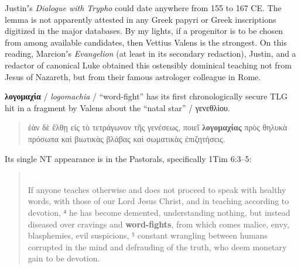 Justinʼs \textit{Dialogue with Trypho} could date anywhere from 155 to 167 CE. %
The lemma is not apparently attested in any Greek papyri or Greek inscriptions %
digitized in the major databases. %
By my lights, if a progenitor is to be chosen from among available candidates, %
then Vettius Valens is the strongest. %
On this reading, Marcionʼs \textit{Evangelion} (at least in its secondary redaction), %
Justin, and a redactor of canonical Luke obtained this ostensibly dominical teaching %
not from Jesus of Nazareth, but from their famous astrologer colleague in Rome. %
\clearpage

\noindent{}\textbf{λογομαχία} / \textit{logomachia} / “word-fight” %
has its first chronologically secure TLG hit in a fragment by Valens about the “natal star” / γενεθλίου. %

\vspace*{3mm} 
 \begin{quote}ἐὰν δὲ ἔλθῃ εἰς τὸ τετράγωνον τῆς γενέσεως, %
 ποιεῖ \textbf{λογομαχίας} πρὸς θηλυκὰ πρόσωπα καὶ %
 βιωτικὰς βλάβας καὶ σωματικὰς ἐπιζητήσεις. \\[1mm] %
 \end{quote} %
\vspace*{3mm}

\noindent{}Its single NT appearance is in the Pastorals, specifically 1Tim 6:3--5: 

\vspace*{3mm} 
 \begin{quote} \\[1mm] %
 If anyone teaches otherwise and does not proceed to speak with healthy words, %
 with those of our Lord Jesus Christ, and in teaching according to devotion, %
 ⁴ he has become demented, understanding nothing, %
 but instead diseased over cravings and \textbf{word-fights}, %
 from which comes malice, envy, blasphemies, evil suspicions, %
 ⁵ constant wrangling between humans corrupted in the mind %
 and defrauding of the truth, who deem monetary gain to be devotion. %
\end{quote} %
 \vspace*{3mm}

